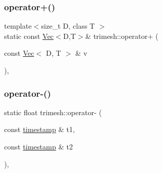 \mbox{\label{namespacetrimesh_af9ba60a3ce4c61880843064f5f5f086f}} 
\subsubsection{\texorpdfstring{operator+()}{operator+()}\hspace{0.1cm}{\footnotesize\ttfamily [3/3]}}
{\footnotesize\ttfamily template$<$size\+\_\+t D, class T $>$ \\
static const \hyperlink{classtrimesh_1_1Vec}{Vec}$<$D,T$>$\& trimesh\+::operator+ (\begin{DoxyParamCaption}\item[{const \hyperlink{classtrimesh_1_1Vec}{Vec}$<$ D, T $>$ \&}]{v }\end{DoxyParamCaption})\hspace{0.3cm}{\ttfamily [inline]}, {\ttfamily [static]}}

\mbox{\label{namespacetrimesh_ae09626ee94207fe21f07ab66c96bd437}} 
\subsubsection{\texorpdfstring{operator-\/()}{operator-()}\hspace{0.1cm}{\footnotesize\ttfamily [1/4]}}
{\footnotesize\ttfamily static float trimesh\+::operator-\/ (\begin{DoxyParamCaption}\item[{const \hyperlink{namespacetrimesh_afc360812cb91ca27ac234664b59fe356}{timestamp} \&}]{t1,  }\item[{const \hyperlink{namespacetrimesh_afc360812cb91ca27ac234664b59fe356}{timestamp} \&}]{t2 }\end{DoxyParamCaption})\hspace{0.3cm}{\ttfamily [inline]}, {\ttfamily [static]}}

\mbox{\label{namespacetrimesh_acc3ec38b95c8dcc3d5d20f3226ca1b6b}} 
